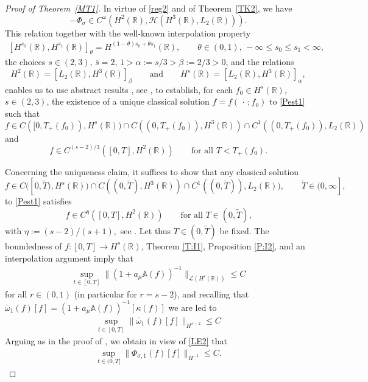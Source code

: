 \documentclass[11pt,reqno]{amsart}
\numberwithin{equation}{section}
\newcommand{\0}{\Omega}
\newcommand{\wt}{\widetilde}
\newcommand{\ov}{\overline}
\newcommand{\oo}{\ov\omega}
\newcommand{\bA}{\mathbb{A}}
\newcommand{\kH}{\mathcal{H}}
\newcommand{\kL}{\mathcal{L}}
\newcommand{\R}{\mathbb{R}}
\numberwithin{equation}{section}
\begin{document}
\begin{proof}[Proof of Theorem~\ref{MT1}]
 In virtue of \eqref{reg2} and of Theorem~\ref{TK2}, we have 
 \[
-\Phi_{\sigma}\in C^{\omega}(H^{2}(\R),\kH(H^3(\R), L_2(\R))).
\]
This relation together with the well-known interpolation property
\begin{align}\label{CI}
[H^{s_0}(\R),H^{s_1}(\R)]_\theta=H^{(1-\theta)s_0+\theta s_1}(\R),\qquad\theta\in(0,1),\, -\infty\leq s_0\leq s_1<\infty,
\end{align}
the choices $s\in(2,3)$, $\ov s=2$, $1>\alpha:=s/3>\beta:=2/3>0$, and the relations
 \[
  H^{2}(\R)=[L_2(\R), H^3(\R)]_{\beta} \qquad\text{and}\qquad H^s(\R)=[L_2(\R), H^3(\R)]_{\alpha},
 \]
enables us to use  abstract results  \cite{Am93, Am86, Am88}, see \cite[Theorem 1.5]{M16x}, to establish, for each  $f_0\in H^s(\mathbb{R})$, $s\in(2,3)$,  the existence of a unique classical solution  $f= f(\,\cdot\, ; f_0)$
to    \eqref{Pest1}   such that 
 \begin{equation*} 
 f\in C([0,T_+(f_0)),H^s(\mathbb{R}))\cap C((0,T_+(f_0)), H^3(\mathbb{R}))\cap C^1((0,T_+(f_0)), L_2(\mathbb{R}))
  \end{equation*}
and\begin{equation*} 
 f\in C^{(s-2)/3}([0,T],H^{2}(\mathbb{R})) \qquad\text{for all $T<T_+(f_0)$}.
  \end{equation*}


Concerning  the uniqueness claim, it suffices to  show  that any classical solution 
 \begin{equation*} 
 f\in C([0,\wt  T),H^s(\R))\cap C((0,\wt T), H^3(\R))\cap C^1((0,\wt T)), L_2(\R)),\qquad \wt T\in(0,\infty],
 \end{equation*}  
to \eqref{Pest1}   satisfies 
  \begin{equation} \label{T:EEE2}
   f\in C^\eta([0,T],H^{2}(\R))\qquad \text{for all $T\in(0,\wt T)$,}
 \end{equation}
with $\eta:=(s-2)/(s+1),$  see \cite[Theorem 1.5]{M16x}.
Let thus $T\in(0,\wt T)$ be fixed. 
The boundedness of $f:[0,T]\to H^s(\R)$, Theorem \ref{T:I1},  Proposition \ref{P:I2}, and an interpolation argument imply that
\begin{align*} 
\sup_{t\in[0,T]}\|(1+a_\mu \bA(f))^{-1}\|_{\kL(H^{r}(\R))}\leq C 
\end{align*}
for all $r\in(0,1)$ (in particular for $r=s-2$), and recalling that $\oo_1(f)[f]= (1+a_\mu \bA(f))^{-1}[\kappa(f)]$ we are led to
\begin{align}\label{LE2}
\sup_{t\in[0,T]}\|\oo_1(f)[f]\|_{H^{s-2}}\leq C 
\end{align}
Arguing as in the proof of \cite[Theorem 1.2]{M16x}, we obtain in view of \eqref{LE2}  that
\begin{align}\label{DEDE1}
\sup_{t\in(0,T]}\|\Phi_{\sigma,1}(f)[f]\|_{H^{-1}}\leq C.
\end{align}


\end{proof}
\end{document}
